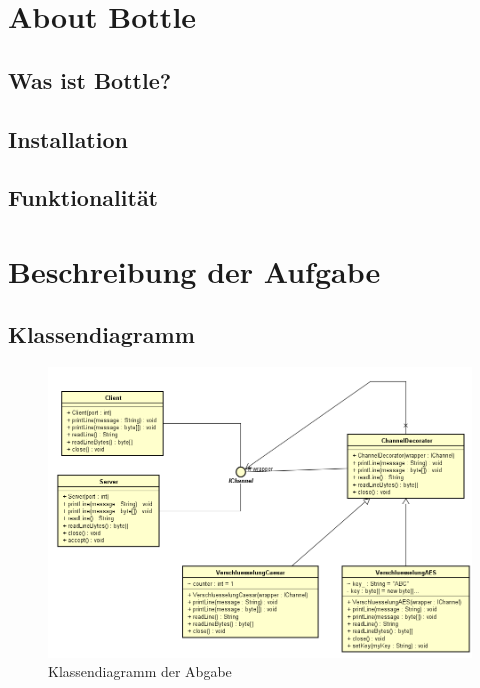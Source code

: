 \clearpage
\section{About Bottle}
\subsection{Was ist Bottle?}
\subsection{Installation}
\subsection{Funktionalität}
\section{Beschreibung der Aufgabe}
\subsection{Klassendiagramm}
	\begin{figure}[H]
	\centering
	\includegraphics[width=1\textwidth]{images/abgabe.png}
	\caption{Klassendiagramm der Abgabe} 
\end{figure}
